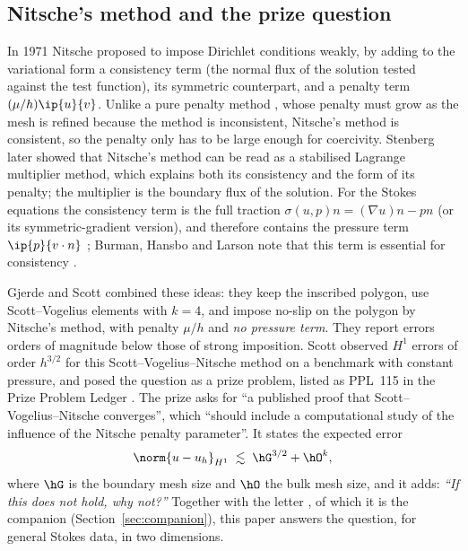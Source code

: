 \subsection{Nitsche's method and the prize question}
In 1971 Nitsche \cite{Nitsche1971} proposed to impose Dirichlet conditions weakly, by adding to the variational form a consistency term (the normal flux of the solution tested against the test function), its symmetric counterpart, and a penalty term $(\mu/h)\ip{u}{v}$. Unlike a pure penalty method \cite{Babuska1973}, whose penalty must grow as the mesh is refined because the method is inconsistent, Nitsche's method is consistent, so the penalty only has to be large enough for coercivity. Stenberg \cite{Stenberg1995} later showed that Nitsche's method can be read as a stabilised Lagrange multiplier method, which explains both its consistency and the form of its penalty; the multiplier is the boundary flux of the solution. For the Stokes equations the consistency term is the full traction $\sigma(u,p)n=(\nabla u)n-pn$ (or its symmetric-gradient version), and therefore contains the pressure term $\ip{p}{v\cdot n}$ \cite{FreundStenberg1995,Stenberg1995,Becker2002,BurmanHansbo2014}; Burman, Hansbo and Larson note that this term is essential for consistency \cite{BurmanHansboLarson2019Stokes}.

Gjerde and Scott \cite{GjerdeScott2024} combined these ideas: they keep the inscribed polygon, use Scott--Vogelius elements with $k=4$, and impose no-slip on the polygon by Nitsche's method, with penalty $\mu/h$ and \emph{no pressure term}. They report errors orders of magnitude below those of strong imposition. Scott observed $H^1$ errors of order $h^{3/2}$ for this Scott--Vogelius--Nitsche method on a benchmark with constant pressure, and posed the question as a prize problem, listed as PPL~115 in the Prize Problem Ledger \cite{ScottPrize}. The prize asks for ``a published proof that Scott--Vogelius--Nitsche converges'', which ``should include a computational study of the influence of the Nitsche penalty parameter''. It states the expected error
\[
\norm{u-u_h}_{H^1}\;\lesssim\;\hG^{3/2}+\hO^k,
\]
where $\hG$ is the boundary mesh size and $\hO$ the bulk mesh size, and it adds: \emph{``If this does not hold, why not?''} Together with the letter \cite{CavalcantePadhiLetter}, of which it is the companion (Section~\ref{sec:companion}), this paper answers the question, for general Stokes data, in two dimensions.

